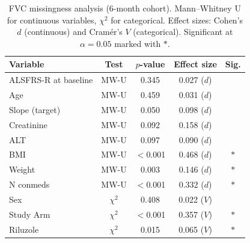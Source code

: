 \begin{table}[ht]
\centering
\caption{FVC missingness analysis (6-month cohort). Mann--Whitney U for continuous variables, $\chi^2$ for categorical. Effect sizes: Cohen's $d$ (continuous) and Cramér's $V$ (categorical). Significant at $\alpha = 0.05$ marked with $\ast$.}
\label{tab:fvc_missingness}
\small
\begin{tabular}{lcccc}
\toprule
Variable & Test & $p$-value & Effect size & Sig. \\
\midrule
ALSFRS-R at baseline & MW-U & 0.345 & 0.027 ($d$) &  \\
Age & MW-U & 0.459 & 0.031 ($d$) &  \\
Slope (target) & MW-U & 0.050 & 0.098 ($d$) &  \\
Creatinine & MW-U & 0.092 & 0.158 ($d$) &  \\
ALT & MW-U & 0.097 & 0.090 ($d$) &  \\
BMI & MW-U & $<$0.001 & 0.468 ($d$) & $\ast$ \\
Weight & MW-U & 0.003 & 0.146 ($d$) & $\ast$ \\
N conmeds & MW-U & $<$0.001 & 0.332 ($d$) & $\ast$ \\
Sex & $\chi^2$ & 0.408 & 0.022 ($V$) &  \\
Study Arm & $\chi^2$ & $<$0.001 & 0.357 ($V$) & $\ast$ \\
Riluzole & $\chi^2$ & 0.015 & 0.065 ($V$) & $\ast$ \\
\bottomrule
\end{tabular}
\end{table}